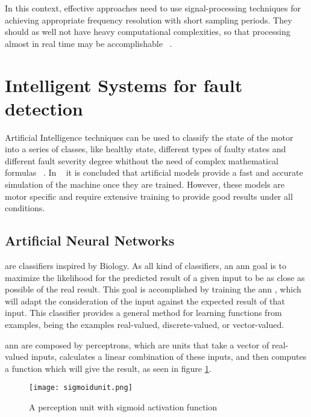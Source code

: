 In this context, effective approaches need to use signal-processing techniques for achieving appropriate frequency resolution with short sampling periods. They should as well not have heavy computational complexities, so that processing almost in real time may be accomplishable ~\cite{Riera-Guasp2015}. 

\section{Intelligent Systems for fault detection} %
\label{sec:machine_learning_approaches}
Artificial Intelligence techniques can be used to classify the state of the motor into a series of classes, like healthy state, different types of faulty states and different fault severity degree whithout the need of complex mathematical formulas ~\cite{Riera-Guasp2015}. In ~\cite{Gandhi2011} it is concluded that artificial models provide a fast and accurate simulation of the machine once they are trained.
However, these models are motor specific and require extensive training to provide good results under all conditions.

\subsection{Artificial Neural Networks} %
\label{sec:ann}


 are classifiers inspired by Biology. As all kind of classifiers, an \Acrshort{ann} goal is to maximize the likelihood for the predicted result of a given input to be as close as possible of the real result. This goal is accomplished by training the \Acrshort{ann} , which will adapt the consideration of the input against the expected result of that input. This classifier provides a general method for learning functions from examples, being the examples real-valued, discrete-valued, or vector-valued.

\Acrshort{ann} are composed by perceptrons, which are units that take a vector of real-valued inputs, calculates a linear combination of these inputs, and then computes a function which will give the result, as seen in figure \ref{fig:sigmoid_unit}.

\begin{figure}[htpb]
\centering
\texttt{[image: sigmoidunit.png]}
\caption{A perception unit with sigmoid activation function}
\label{fig:sigmoid_unit}
\end{figure}

